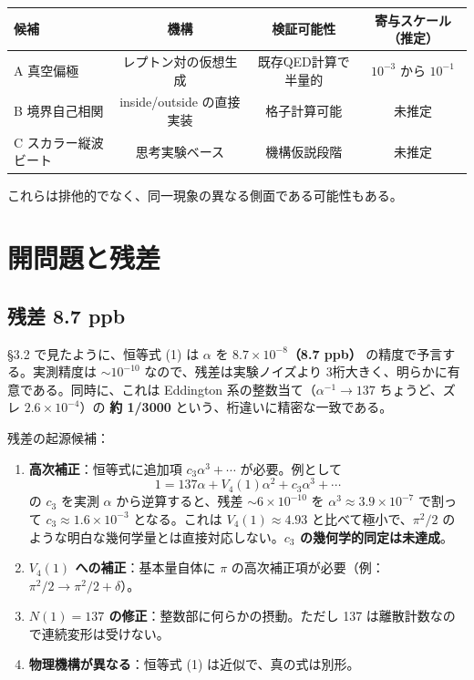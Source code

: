 \documentclass[a4paper,11pt]{ltjsarticle}
\begin{document}
\begin{center}
\begin{tabular}{lccc}
\toprule
候補 & 機構 & 検証可能性 & 寄与スケール（推定） \\
\midrule
A 真空偏極 & レプトン対の仮想生成 & 既存QED計算で半量的 & $10^{-3}$ から $10^{-1}$ \\
B 境界自己相関 & inside/outside の直接実装 & 格子計算可能 & 未推定 \\
C スカラー縦波ビート & 思考実験ベース & 機構仮説段階 & 未推定 \\
\bottomrule
\end{tabular}
\end{center}

これらは排他的でなく、同一現象の異なる側面である可能性もある。

\section{開問題と残差}

\subsection{残差 8.7 ppb}

§3.2 で見たように、恒等式 (1) は $\alpha$ を \textbf{$8.7 \times 10^{-8}$（8.7 ppb）} の精度で予言する。実測精度は $\sim 10^{-10}$ なので、残差は実験ノイズより 3桁大きく、明らかに有意である。同時に、これは Eddington 系の整数当て（$\alpha^{-1} \to 137$ ちょうど、ズレ $2.6 \times 10^{-4}$）の \textbf{約 1/3000} という、桁違いに精密な一致である。

残差の起源候補：

\begin{enumerate}
\item \textbf{高次補正}：恒等式に追加項 $c_3 \alpha^3 + \cdots$ が必要。例として
\[ 1 = 137\alpha + V_4(1)\alpha^2 + c_3 \alpha^3 + \cdots \]
の $c_3$ を実測 $\alpha$ から逆算すると、残差 $\sim 6 \times 10^{-10}$ を $\alpha^3 \approx 3.9 \times 10^{-7}$ で割って $c_3 \approx 1.6 \times 10^{-3}$ となる。これは $V_4(1) \approx 4.93$ と比べて極小で、$\pi^2/2$ のような明白な幾何学量とは直接対応しない。\textbf{$c_3$ の幾何学的同定は未達成}。

\item \textbf{$V_4(1)$ への補正}：基本量自体に $\pi$ の高次補正項が必要（例：$\pi^2/2 \to \pi^2/2 + \delta$）。

\item \textbf{$N(1) = 137$ の修正}：整数部に何らかの摂動。ただし 137 は離散計数なので連続変形は受けない。

\item \textbf{物理機構が異なる}：恒等式 (1) は近似で、真の式は別形。
\end{enumerate}
\end{document}
